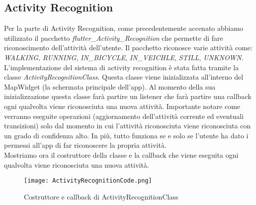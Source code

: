 \documentclass[../../Report.tex]{subfiles}
\begin{document}
\subsection{Activity Recognition}
Per la parte di Activity Recognition, come precedentemente accenato abbiamo utilizzato il pacchetto \emph{flutter\_Activity\_Recognition} che permette di fare riconoscimento dell'attività dell'utente. Il pacchetto riconosce varie attività come: \emph{WALKING}, \emph{RUNNING}, \emph{IN\_BICYCLE}, \emph{IN\_VEICHLE}, \emph{STILL}, \emph{UNKNOWN}. L'implementazione del sistema di activity recognition è stata fatta tramite la classe \emph{ActivityRecognitionClass}. Questa classe viene inizializzata all'interno del MapWidget (la schermata principale dell'app). Al momento della sua inizializzazione questa classe farà partire un listener che farà partire una callback ogni qualvolta viene riconosciuta una nuova attività. Importante notare come verranno eseguite operazioni (aggiornamento dell'attività corrente ed eventuali transizioni) solo dal momento in cui l'attività riconosciuta viene riconosciuta con un grado di confidenza alto. In più, tutto funziona se e solo se l'utente ha dato i permessi all'app di far riconoscere la propria attività.\\
Mostriamo ora il costruttore della classe e la callback che viene eseguita ogni qualvolta viene riconosciuta una nuova attività.\\
\begin{figure}[H]
  \centering
  \texttt{[image: ActivityRecognitionCode.png]}
  \caption{Costruttore e callback di ActivityRecognitionClass}
  \end{figure}
\end{document}
